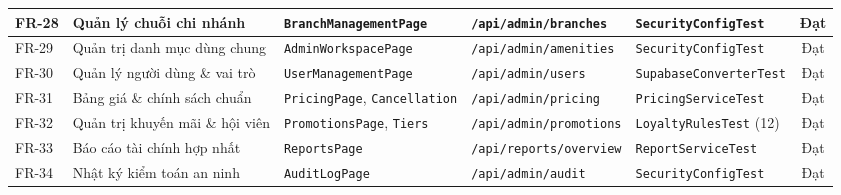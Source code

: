 \begin{table}[H]
\begin{tabular}{|p{1.0cm}|p{3.8cm}|p{2.6cm}|p{2.8cm}|p{2.6cm}|c|}
\hline
FR-28 & Quản lý chuỗi chi nhánh & \texttt{BranchManagementPage} & \texttt{/api/admin/branches} & \texttt{SecurityConfigTest} & Đạt \\
\hline
FR-29 & Quản trị danh mục dùng chung & \texttt{AdminWorkspacePage} & \texttt{/api/admin/amenities} & \texttt{SecurityConfigTest} & Đạt \\
\hline
FR-30 & Quản lý người dùng \& vai trò & \texttt{UserManagementPage} & \texttt{/api/admin/users} & \texttt{SupabaseConverterTest} & Đạt \\
\hline
FR-31 & Bảng giá \& chính sách chuẩn & \texttt{PricingPage}, \texttt{Cancellation} & \texttt{/api/admin/pricing} & \texttt{PricingServiceTest} & Đạt \\
\hline
FR-32 & Quản trị khuyến mãi \& hội viên & \texttt{PromotionsPage}, \texttt{Tiers} & \texttt{/api/admin/promotions} & \texttt{LoyaltyRulesTest} (12) & Đạt \\
\hline
FR-33 & Báo cáo tài chính hợp nhất & \texttt{ReportsPage} & \texttt{/api/reports/overview} & \texttt{ReportServiceTest} & Đạt \\
\hline
FR-34 & Nhật ký kiểm toán an ninh & \texttt{AuditLogPage} & \texttt{/api/admin/audit} & \texttt{SecurityConfigTest} & Đạt \\
\hline
\end{tabular}
\end{table}
